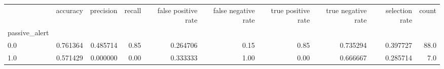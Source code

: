 \begin{tabular}{lrrrrrrrrr}
\toprule
{} &  accuracy &  precision &  recall &  false positive rate &  false negative rate &  true positive rate &  true negative rate &  selection rate &  count \\
passive\_alert &           &            &         &                      &                      &                     &                     &                 &        \\
\midrule
0.0           &  0.761364 &   0.485714 &    0.85 &             0.264706 &                 0.15 &                0.85 &            0.735294 &        0.397727 &   88.0 \\
1.0           &  0.571429 &   0.000000 &    0.00 &             0.333333 &                 1.00 &                0.00 &            0.666667 &        0.285714 &    7.0 \\
\bottomrule
\end{tabular}
